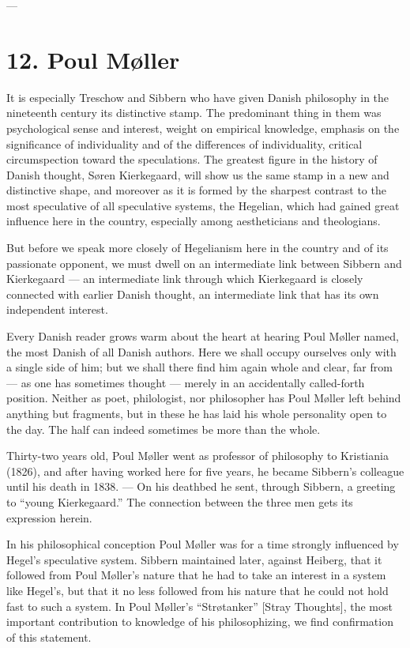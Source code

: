 \documentclass[12pt,a4paper]{book}
\newcommand{\dfchapter}[1]{%
  \chapter*{#1}%
  \addcontentsline{toc}{chapter}{#1}%
  \markboth{#1}{#1}%
}
\newcommand{\opage}[1]{\marginnote{\footnotesize\textit{[#1]}}}
\begin{document}
\begin{center}---\end{center}

\dfchapter{12. Poul Møller}
\label{ch:df-moller}

\noindent \opage{118}It is especially Treschow and Sibbern who have given Danish philosophy in the
nineteenth century its distinctive stamp. The predominant thing in them was psychological
sense and interest, weight on empirical knowledge, emphasis on the significance of
individuality and of the differences of individuality, critical circumspection toward the
speculations. The greatest figure in the history of Danish thought, Søren Kierkegaard, will
show us the same stamp in a new and distinctive shape, and moreover as it is formed by the
sharpest contrast to the most speculative of all speculative systems, the Hegelian, which
had gained great influence here in the country, especially among aestheticians and
theologians.

But before we speak more closely of Hegelianism here in the country and of its passionate
opponent, we must dwell on an intermediate link between Sibbern and Kierkegaard --- an
intermediate link through which Kierkegaard is closely connected with earlier Danish
thought, an intermediate link that has its own independent interest.

Every Danish reader grows warm about the heart at hearing Poul Møller named, the most
Danish of all Danish authors. Here we shall occupy ourselves only with a single side of
him; but we shall there find him again whole and clear, far from --- as one has sometimes
thought --- merely in an accidentally called-forth position. Neither as poet, philologist,
nor philosopher has Poul Møller left behind anything but fragments, but in these he has laid
his whole personality open to the day. The half can indeed sometimes be more than the whole.

\opage{119}Thirty-two years old, Poul Møller went as professor of philosophy to Kristiania (1826), and
after having worked here for five years, he became Sibbern's colleague until his death in
1838. --- On his deathbed he sent, through Sibbern, a greeting to ``young Kierkegaard.'' The
connection between the three men gets its expression herein.

In his philosophical conception Poul Møller was for a time strongly influenced by Hegel's
speculative system. Sibbern maintained later, against Heiberg, that it followed from Poul
Møller's nature that he had to take an interest in a system like Hegel's, but that it no
less followed from his nature that he could not hold fast to such a system. In Poul
Møller's ``Strøtanker'' [Stray Thoughts], the most important contribution to knowledge of
his philosophizing, we find confirmation of this statement.
\end{document}
